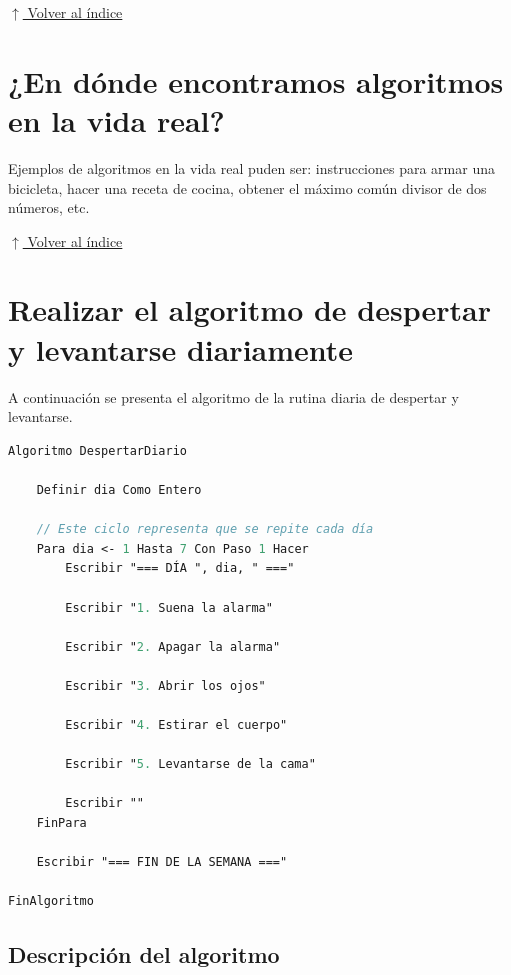 \documentclass[12pt]{article}
\newcommand{\volverindice}{%
    \vspace{1em}%
    \begin{flushright}%
        \hyperlink{indice}{\small $\uparrow$ Volver al índice}%
    \end{flushright}%
}
\begin{document}
\volverindice
\newpage


\section{¿En dónde encontramos algoritmos en la vida real?}

Ejemplos de algoritmos en la vida real puden ser: instrucciones para armar una bicicleta, hacer una receta de cocina, obtener el máximo común divisor de dos números, etc.

\volverindice
\newpage


\section{Realizar el algoritmo de despertar y levantarse diariamente}

A continuación se presenta el algoritmo de la rutina diaria de despertar y levantarse.

\begin{lstlisting}[style=python, caption={Algoritmo de despertar y levantarse diariamente (PSeInt)}, language=Pascal]
Algoritmo DespertarDiario

    Definir dia Como Entero
    
    // Este ciclo representa que se repite cada día
    Para dia <- 1 Hasta 7 Con Paso 1 Hacer
        Escribir "=== DÍA ", dia, " ==="
        
        Escribir "1. Suena la alarma"
        
        Escribir "2. Apagar la alarma"
        
        Escribir "3. Abrir los ojos"
        
        Escribir "4. Estirar el cuerpo"
        
        Escribir "5. Levantarse de la cama"
        
        Escribir ""
    FinPara
    
    Escribir "=== FIN DE LA SEMANA ==="
    
FinAlgoritmo
\end{lstlisting}

\subsection{Descripción del algoritmo}
\end{document}
